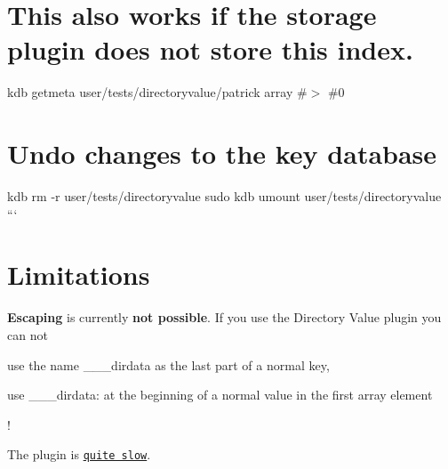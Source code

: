 \section*{This also works if the storage plugin does not store this index.}

kdb getmeta user/tests/directoryvalue/patrick array \#$>$ \#0

\section*{Undo changes to the key database}

kdb rm -\/r user/tests/directoryvalue sudo kdb umount user/tests/directoryvalue ```

\section*{Limitations}


\begin{DoxyItemize}
\item {\bfseries Escaping} is currently {\bfseries not possible}. If you use the Directory Value plugin you can not
\begin{DoxyItemize}
\item use the name {\ttfamily \+\_\+\+\_\+\+\_\+dirdata} as the last part of a normal key,
\item use {\ttfamily \+\_\+\+\_\+\+\_\+dirdata\+:} at the beginning of a normal value in the first array element
\end{DoxyItemize}

!
\item The plugin is \href{https://issues.libelektra.org/2281}{\tt quite slow}. 
\end{DoxyItemize}